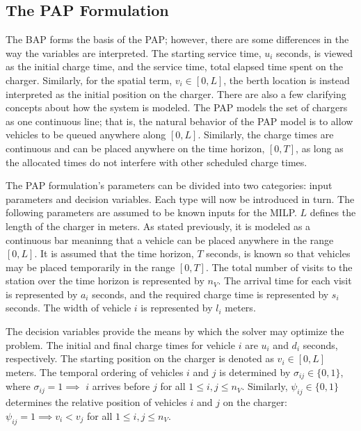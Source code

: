 \documentclass[ee,thesis]{usuthesis}
\begin{document}
\subsection{The PAP Formulation}
\label{sec:the-pap-formulation}
The BAP forms the basis of the PAP; however, there are some differences in the way the variables are interpreted. The
starting service time, \(u_i\) seconds, is viewed as the initial charge time, and the service time, total elapsed time
spent on the charger. Similarly, for the spatial term, \(v_i \in [0,L]\), the berth location is instead interpreted as the
initial position on the charger. There are also a few clarifying concepts about how the system is modeled. The PAP
models the set of chargers as one continuous line; that is, the natural behavior of the PAP model is to allow vehicles
to be queued anywhere along \([0,L]\). Similarly, the charge times are continuous and can be placed anywhere on the time
horizon, \([0,T]\), as long as the allocated times do not interfere with other scheduled charge times.

The PAP formulation's parameters can be divided into two categories: input parameters and decision variables. Each type
will now be introduced in turn. The following parameters are assumed to be known inputs for the MILP. \(L\) defines the
length of the charger in meters. As stated previously, it is modeled as a continuous bar meaninng that a vehicle can be
placed anywhere in the range \([0,L]\). It is assumed that the time horizon, \(T\) seconds, is known so that vehicles may be
placed temporarily in the range \([0,T]\). The total number of visits to the station over the time horizon is represented
by \(n_V\). The arrival time for each visit is represented by \(a_i\) seconds, and the required charge time is represented
by \(s_i\) seconds. The width of vehicle \(i\) is represented by \(l_i\) meters.

The decision variables provide the means by which the solver may optimize the problem. The initial and final charge
times for vehicle \(i\) are \(u_i\) and \(d_i\) seconds, respectively. The starting position on the charger is denoted as \(v_i
\in [0,L]\) meters. The temporal ordering of vehicles \(i\) and \(j\) is determined by \(\sigma_{ij} \in \{0, 1\}\), where \(\sigma_{ij} = 1
\implies\) \(i\) arrives before \(j\) for all \(1 \le i,j \le n_V\). Similarly, \(\psi_{ij} \in \{0, 1\}\) determines the relative
position of vehicles \(i\) and \(j\) on the charger: \(\psi_{ij} = 1 \implies v_i < v_j\) for all \(1 \le i,j \le n_V\).
\end{document}
